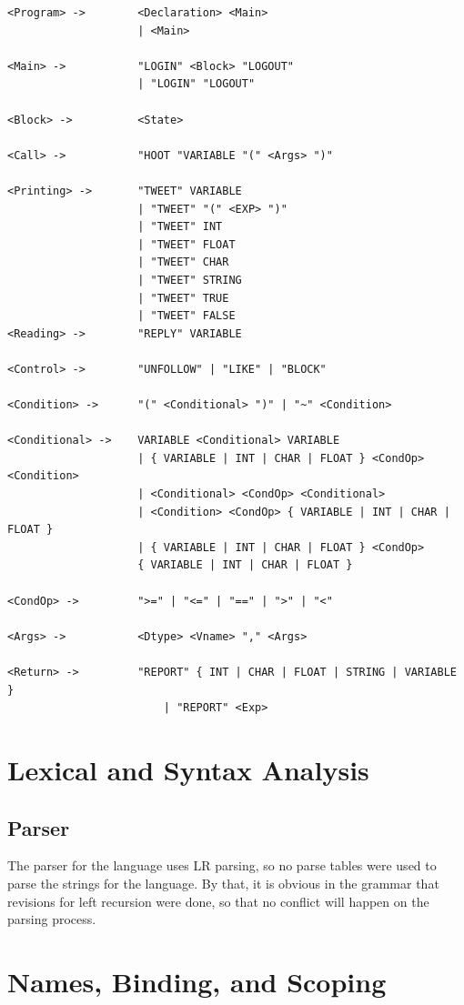 \documentclass[11pt,a4paper]{report}
\begin{document}
\begin{lstlisting}
<Program> ->		<Declaration> <Main>
            		| <Main>
            
<Main> ->			"LOGIN" <Block> "LOGOUT"
          			| "LOGIN" "LOGOUT"
          			
<Block> ->			<State>

<Call> ->			"HOOT "VARIABLE "(" <Args> ")"

<Printing> -> 		"TWEET" VARIABLE
              		| "TWEET" "(" <EXP> ")"
              		| "TWEET" INT
              		| "TWEET" FLOAT
              		| "TWEET" CHAR
              		| "TWEET" STRING
              		| "TWEET" TRUE
              		| "TWEET" FALSE
<Reading> ->		"REPLY" VARIABLE

<Control> ->		"UNFOLLOW" | "LIKE" | "BLOCK"

<Condition> ->		"(" <Conditional> ")" | "~" <Condition>

<Conditional> ->	VARIABLE <Conditional> VARIABLE
          			| { VARIABLE | INT | CHAR | FLOAT } <CondOp> <Condition>
          			| <Conditional> <CondOp> <Conditional>
          			| <Condition> <CondOp> { VARIABLE | INT | CHAR | FLOAT }
          			| { VARIABLE | INT | CHAR | FLOAT } <CondOp>
          			{ VARIABLE | INT | CHAR | FLOAT }
          			
<CondOp> ->			">=" | "<=" | "==" | ">" | "<"

<Args> ->			<Dtype> <Vname> "," <Args>

<Return> ->			"REPORT" { INT | CHAR | FLOAT | STRING | VARIABLE }
						| "REPORT" <Exp>
\end{lstlisting}

\chapter{Lexical and Syntax Analysis}

\section{Parser}

The parser for the language uses LR parsing, so no parse tables were used to
parse the strings for the language. By that, it is obvious in the grammar that
revisions for left recursion were done, so that no conflict will happen on the
parsing process.

\chapter{Names, Binding, and Scoping}
\end{document}
